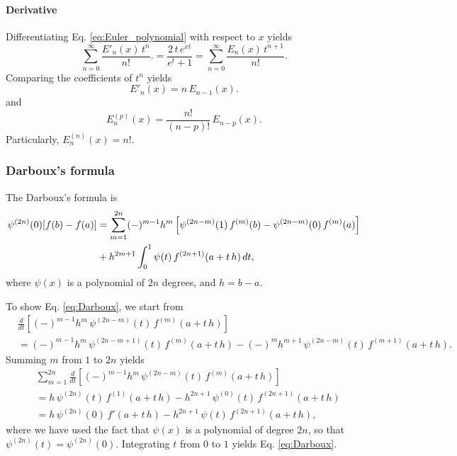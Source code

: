 \documentclass[aip,jcp,preprint,notitlepage, superscriptaddress]{revtex4-1}
\begin{document}
\paragraph{Derivative}




Differentiating Eq. \eqref{eq:Euler_polynomial}
with respect to $x$ yields
\[
\sum_{n = 0}^\infty \frac{ E'_n(x) \, t^{n} } { n! }.
=
\frac{ 2 \, t \, e^{x t} }
{ e^t + 1 }
=
\sum_{n = 0}^\infty \frac{ E_n(x) \, t^{n + 1} } { n! }.
\]
Comparing the coefficients of $t^n$ yields
\[
E'_n(x)
=
n \, E_{n-1}(x).
\]
and
\begin{equation}
  E^{(p)}_n(x)
=
\frac{n!}{(n-p)!} \, E_{n-p}(x).
\label{eq:dEuler_polynomial}
\end{equation}
Particularly,
$E^{(n)}_n(x) = n!$.




\subsubsection{Darboux's formula}



The Darboux's formula\cite{
whittaker, wang_specfunc}
is
%
\begin{align}
\psi^{(2n)}(0) [f(b) - f(a)]
&=
\sum_{m = 1}^{2n}
  (-)^{m - 1} h^m
  \left[
    \psi^{(2n - m)}(1) \, f^{(m)}(b)
    -
    \psi^{(2n - m)}(0) \, f^{(m)}(a)
  \right]
\notag \\
&
+h^{2m + 1}
\int_0^1
  \psi(t) \, f^{(2n+1)}(a + t \, h) \, dt,
\label{eq:Darboux}
\end{align}
where
$\psi(x)$ is a polynomial of $2n$ degrees,
and $h = b - a$.



To show Eq. \eqref{eq:Darboux},
we start from
%
\begin{align*}
&\frac{ d } { dt }
\left[
  (-)^{m - 1} h^m \,
  \psi^{(2 n - m)}(t) \, f^{(m)}(a + t \, h)
\right]
\\
&=
(-)^{m-1} h^m \,
  \psi^{(2 n - m + 1)}(t) \, f^{(m)}(a + t \, h)
-
(-)^m h^{m + 1} \,
  \psi^{(2 n - m)}(t) \, f^{(m + 1)}(a + t \, h).
\end{align*}
%
Summing $m$ from $1$ to $2 n$ yields
%
\begin{align*}
&\sum_{m = 1}^{2 n}
\frac{ d } { dt }
  \left[
    (-)^{m - 1} h^m \,
    \psi^{(2 n - m)}(t) \, f^{(m)}(a + t \, h)
  \right]
\\
&=
h \,
  \psi^{(2 n)}(t) \, f^{(1)}(a + t \, h)
-
h^{2 n + 1} \,
  \psi^{(0)}(t) \, f^{(2 n + 1)}(a + t \, h)
\\
&=
h \,
  \psi^{(2 n)}(0) \, f'(a + t \, h)
-
h^{2 n + 1} \,
  \psi(t) \, f^{(2 n + 1)}(a + t \, h),
\end{align*}
%
where
we have used the fact that
$\psi(x)$ is a polynomial of degree $2n$,
so that
$\psi^{(2 n)}(t) = \psi^{(2 n)}(0)$.
%
Integrating $t$ from $0$ to $1$
yields Eq. \eqref{eq:Darboux}.
\end{document}
